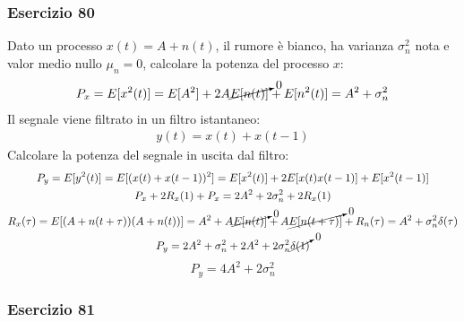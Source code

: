 \documentclass{article}
\begin{document}
\subsubsection*{Esercizio 80}

Dato un processo $x(t)=A+n(t)$, il rumore è bianco, ha varianza $\sigma_n^2$ nota e valor medio nullo $\mu_n=0$, calcolare la potenza del processo $x$:
\begin{gather}
    P_x=E[x^2(t)]=E[A^2]+2A\cancelto{0}{E[n(t)]}+E[n^2(t)]=A^2+\sigma_n^2
\end{gather}
Il segnale viene filtrato in un filtro istantaneo:
\begin{gather*}
    y(t)=x(t)+x(t-1)
\end{gather*}
Calcolare la potenza del segnale in uscita dal filtro:
\begin{gather*}
    P_y=E[y^2(t)]=E[(x(t)+x(t-1))^2]=E[x^2(t)]+2E[x(t)x(t-1)]+E[x^2(t-1)]\\
    P_x+2R_x(1)+P_x=2A^2+2\sigma_n^2+2R_x(1)\\
    R_x(\tau)=E[(A+n(t+\tau))(A+n(t))]=A^2+A\cancelto{0}{E[n(t)]}+A\cancelto{0}{E[n(t+\tau)]}+R_n(\tau)=A^2+\sigma_n^2\delta(\tau)\\
    P_y=2A^2+\sigma_n^2+2A^2+2\sigma_n^2\cancelto{0}{\delta(1)}
\end{gather*}
\begin{equation}
    P_y=4A^2+2\sigma_n^2
\end{equation}

\subsubsection*{Esercizio 81}
\end{document}
